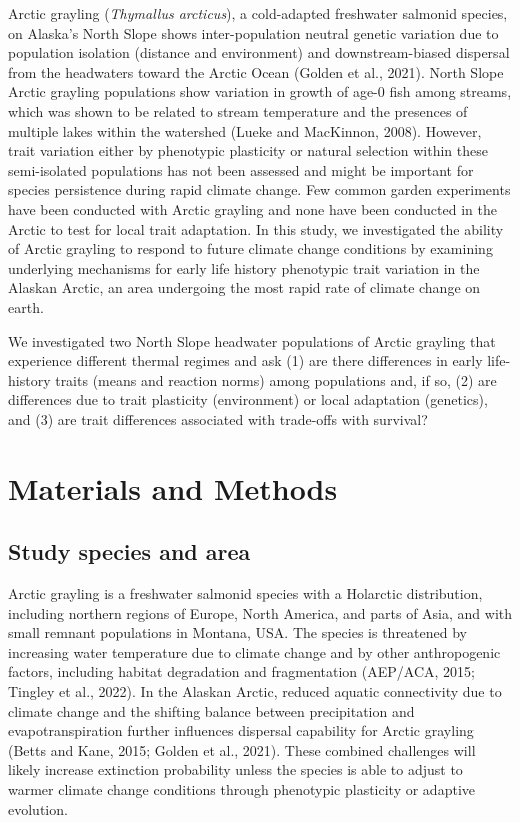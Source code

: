 \documentclass[utf8]{frontiersSCNS}
\begin{document}
Arctic grayling (\textit{Thymallus arcticus}), a cold-adapted freshwater
salmonid species, on Alaska's North Slope shows inter-population neutral
genetic variation due to population isolation (distance and environment)
and downstream-biased dispersal from the headwaters toward the Arctic
Ocean (Golden et al., 2021). North Slope Arctic grayling populations
show variation in growth of age-0 fish among streams, which was shown to
be related to stream temperature and the presences of multiple lakes
within the watershed (Lueke and MacKinnon, 2008). However, trait
variation either by phenotypic plasticity or natural selection within
these semi-isolated populations has not been assessed and might be
important for species persistence during rapid climate change. Few
common garden experiments have been conducted with Arctic grayling and
none have been conducted in the Arctic to test for local trait
adaptation. In this study, we investigated the ability of Arctic
grayling to respond to future climate change conditions by examining
underlying mechanisms for early life history phenotypic trait variation
in the Alaskan Arctic, an area undergoing the most rapid rate of climate
change on earth.

We investigated two North Slope headwater populations of Arctic grayling
that experience different thermal regimes and ask (1) are there
differences in early life-history traits (means and reaction norms)
among populations and, if so, (2) are differences due to trait
plasticity (environment) or local adaptation (genetics), and (3) are
trait differences associated with trade-offs with survival?

\hypertarget{materials-and-methods}{%
\section*{Materials and Methods}\label{materials-and-methods}}

\hypertarget{study-species-and-area}{%
\subsection*{Study species and area}\label{study-species-and-area}}

Arctic grayling is a freshwater salmonid species with a Holarctic
distribution, including northern regions of Europe, North America, and
parts of Asia, and with small remnant populations in Montana, USA. The
species is threatened by increasing water temperature due to climate
change and by other anthropogenic factors, including habitat degradation
and fragmentation (AEP/ACA, 2015; Tingley et al., 2022). In the Alaskan
Arctic, reduced aquatic connectivity due to climate change and the
shifting balance between precipitation and evapotranspiration further
influences dispersal capability for Arctic grayling (Betts and Kane,
2015; Golden et al., 2021). These combined challenges will likely
increase extinction probability unless the species is able to adjust to
warmer climate change conditions through phenotypic plasticity or
adaptive evolution.
\end{document}
